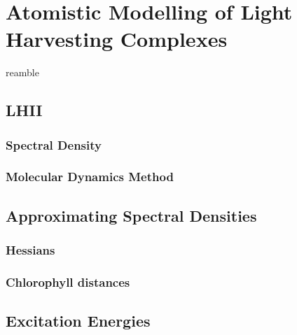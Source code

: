 %
%
\let\textcircled=\pgftextcircled
\chapter{Atomistic Modelling of Light Harvesting Complexes}
\label{chap:LHII}

reamble

\section{LHII}
\label{sec:LHII}

\subsection{Spectral Density}
\label{subsec:spec_dens}

\subsection{Molecular Dynamics Method}
\label{subsec:MD}

\section{Approximating Spectral Densities}
\label{sec:monomer_dimer_assign}

\subsection{Hessians}
\label{subsec:hessians}

\subsection{Chlorophyll distances}
\label{subsec:chl_distances}


\section{Excitation Energies}
\label{sec:excitation_energies}
